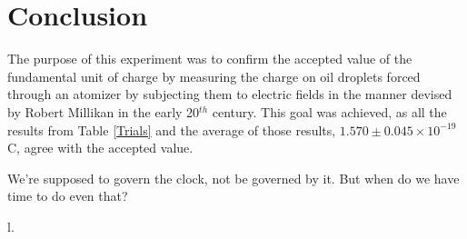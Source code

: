 \documentclass[prb,preprint]{revtex4-1}
\begin{document}
\section{Conclusion}

The purpose of this experiment was to confirm the accepted value of the fundamental unit of charge by measuring the charge on oil droplets forced through an atomizer by subjecting them to electric fields in the manner devised by Robert Millikan in the early 20$^{th}$ century. This goal was achieved, as all the results from Table \ref{Trials} and the average of those results, $1.570\pm0.045\times10^{-19}$ C, agree with the accepted value.

\newpage

\begin{acknowledgments}

We're supposed to govern the clock, not be governed by it. But when do we have time to do even that?

\end{acknowledgments}


\begin{thebibliography}{99}l.

\end{thebibliography}
\end{document}
